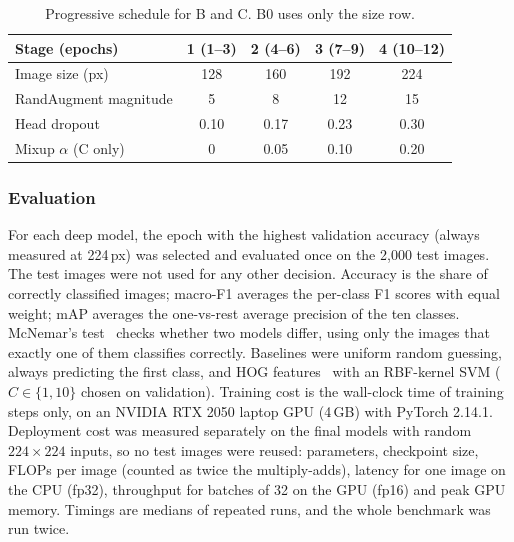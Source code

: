 \documentclass{COMPXXXX}
\begin{document}
\begin{table}[t]
\centering\footnotesize
\caption{Progressive schedule for B and C. B0 uses only the size row.}
\label{tab:sched}
\begin{tabular}{@{}lcccc@{}}
\toprule
Stage (epochs) & 1 (1--3) & 2 (4--6) & 3 (7--9) & 4 (10--12) \\
\midrule
Image size (px) & 128 & 160 & 192 & 224 \\
RandAugment magnitude & 5 & 8 & 12 & 15 \\
Head dropout & 0.10 & 0.17 & 0.23 & 0.30 \\
Mixup $\alpha$ (C only) & 0 & 0.05 & 0.10 & 0.20 \\
\bottomrule
\end{tabular}
\end{table}

\subsubsection{Evaluation}
For each deep model, the epoch with the highest validation accuracy (always measured at 224\,px) was
selected and evaluated once on the 2{,}000 test images. The test images were not used for any other
decision. Accuracy is the share of correctly classified images; macro-F1 averages the per-class F1
scores with equal weight; mAP averages the one-vs-rest average precision of the ten classes. McNemar's
test~\cite{mcnemar1947note} checks whether two models differ, using only the images that exactly one
of them classifies correctly. Baselines were uniform random guessing, always predicting the first
class, and HOG features~\cite{dalal2005histograms} with an RBF-kernel SVM ($C\in\{1,10\}$ chosen on
validation). Training cost is the wall-clock time of training steps only, on an NVIDIA RTX 2050 laptop
GPU (4\,GB) with PyTorch 2.14.1. Deployment cost was measured separately on the final models with
random $224{\times}224$ inputs, so no test images were reused: parameters, checkpoint size, FLOPs per
image (counted as twice the multiply-adds), latency for one image on the CPU (fp32), throughput for
batches of 32 on the GPU (fp16) and peak GPU memory. Timings are medians of repeated runs, and the
whole benchmark was run twice.
\end{document}
